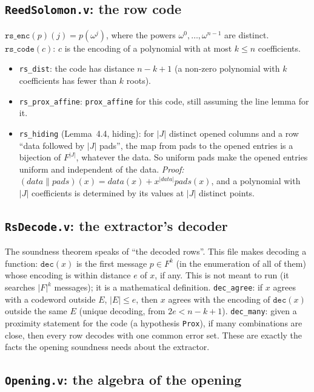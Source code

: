 \documentclass[11pt,a4paper]{article}
\theoremstyle{definition}
\theoremstyle{plain}
\begin{document}
\subsection{\texttt{ReedSolomon.v}: the row code}

$\mathtt{rs\_enc}(p)(j)=p(\omega^j)$, where the powers $\omega^0,\dots,\omega^{n-1}$ are distinct.
$\mathtt{rs\_code}(c)$: $c$ is the encoding of a polynomial with at most $k\le n$ coefficients.
\begin{itemize}[leftmargin=1.3em]
\item \texttt{rs\_dist}: the code has distance $n-k+1$ (a non-zero polynomial with $k$ coefficients has
  fewer than $k$ roots).
\item \texttt{rs\_prox\_affine}: \texttt{prox\_affine} for this code, still assuming the line lemma
  for it.
\item \texttt{rs\_hiding} (Lemma~4.4, hiding): for $|J|$ distinct opened columns and a row
  ``data followed by $|J|$ pads'', the map from pads to the opened entries is a bijection of
  $F^{|J|}$, whatever the data. So uniform pads make the opened entries uniform and independent of
  the data. \emph{Proof:} $(\mathit{data}\|\mathit{pads})(x)=\mathit{data}(x)+x^{|\mathit{data}|}\mathit{pads}(x)$, and a
  polynomial with $|J|$ coefficients is determined by its values at $|J|$ distinct points.
\end{itemize}

\subsection{\texttt{RsDecode.v}: the extractor's decoder}

The soundness theorem speaks of ``the decoded rows''. This file makes decoding a function:
$\mathtt{dec}(x)$ is the first message $p\in F^k$ (in the enumeration of all of them) whose encoding
is within distance $e$ of $x$, if any. This is not meant to run (it searches $|F|^k$ messages); it is
a mathematical definition.
\texttt{dec\_agree}: if $x$ agrees with a codeword outside $E$, $|E|\le e$, then $x$ agrees with the
encoding of $\mathtt{dec}(x)$ outside the same $E$ (unique decoding, from $2e<n-k+1$).
\texttt{dec\_many}: given a proximity statement for the code (a hypothesis \texttt{Prox}), if many
combinations are close, then every row decodes with one common error set. These are exactly the
facts the opening soundness needs about the extractor.

\subsection{\texttt{Opening.v}: the algebra of the opening}
\end{document}

